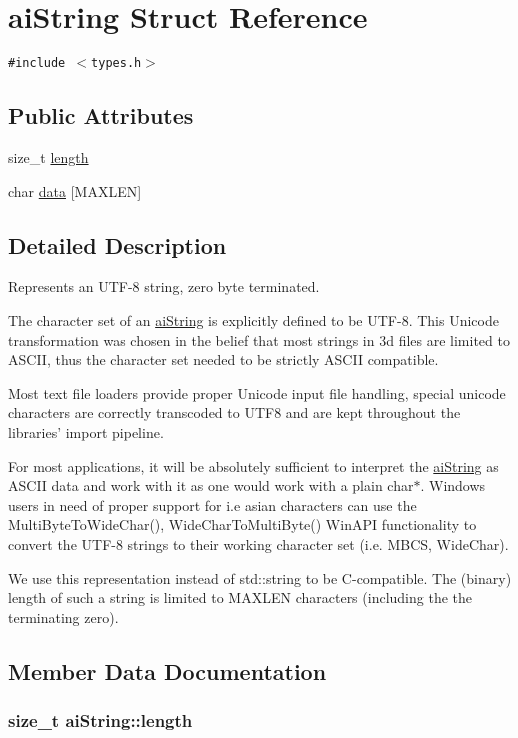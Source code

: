 \hypertarget{structai_string}{
\section{aiString Struct Reference}
\label{structai_string}
}
{\tt \#include $<$types.h$>$}

\subsection*{Public Attributes}
\begin{CompactItemize}
\item 
size\_\-t \hyperlink{structai_string_7d77c2031ff0340746aa046f7fbcf313}{length}
\item 
char \hyperlink{structai_string_a90b1da7d347a3dcca0a95061e6ea41d}{data} \mbox{[}MAXLEN\mbox{]}
\end{CompactItemize}


\subsection{Detailed Description}
Represents an UTF-8 string, zero byte terminated.

The character set of an \hyperlink{structai_string}{aiString} is explicitly defined to be UTF-8. This Unicode transformation was chosen in the belief that most strings in 3d files are limited to ASCII, thus the character set needed to be strictly ASCII compatible.

Most text file loaders provide proper Unicode input file handling, special unicode characters are correctly transcoded to UTF8 and are kept throughout the libraries' import pipeline.

For most applications, it will be absolutely sufficient to interpret the \hyperlink{structai_string}{aiString} as ASCII data and work with it as one would work with a plain char$\ast$. Windows users in need of proper support for i.e asian characters can use the MultiByteToWideChar(), WideCharToMultiByte() WinAPI functionality to convert the UTF-8 strings to their working character set (i.e. MBCS, WideChar).

We use this representation instead of std::string to be C-compatible. The (binary) length of such a string is limited to MAXLEN characters (including the the terminating zero). 

\subsection{Member Data Documentation}
\hypertarget{structai_string_7d77c2031ff0340746aa046f7fbcf313}{
\subsubsection[length]{\setlength{\rightskip}{0pt plus 5cm}size\_\-t {\bf aiString::length}}}
\label{structai_string_7d77c2031ff0340746aa046f7fbcf313}


